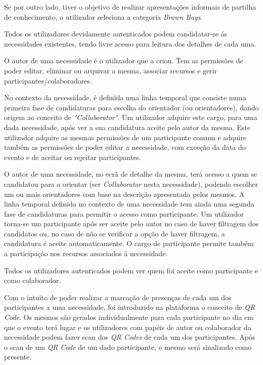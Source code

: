 Se por outro lado, tiver  o objetivo de realizar apresentações informais de partilha de conhecimento, o utilizador seleciona a categoria \textit{Brown Bags}. 
\par
Todos os utilizadores devidamente autenticados podem candidatar-se ás necessidades existentes, tendo livre acesso para leitura dos detalhes de cada uma. 
\par
O autor de uma necessidade é o utilizador que a criou. Tem as permissões de poder editar, eliminar ou arquivar a mesma, associar recursos e gerir participantes/colaboradores.
\par
No contexto da necessidade, é definida uma linha temporal que consiste numa primeira fase de candidaturas para escolha do orientador 
(ou orientadores), dando origem ao conceito de \textit{"Collaborator"}.  
Um utilizador adquire este cargo, para uma dada necessidade, após ver a sua candidatura aceite pelo autor da mesma. Este utilizador adquire as mesmas permissões de um participante comum e adquire também as permissões de poder editar a necessidade, com exceção da data do evento e de aceitar ou rejeitar participantes. 
\par
O autor de uma necessidade, no ecrã de detalhe da mesma, terá acesso a quem se candidatou para a orientar (ser \textit{Collaborator} nesta necessidade), podendo escolher um ou mais orientadores 
com base na descrição apresentada pelos mesmos. 
A linha temporal definida no contexto de uma necessidade tem ainda uma segunda fase de candidaturas para permitir o acesso como participante. 
Um utilizador torna-se um participante após ser aceite pelo autor no caso de haver filtragem dos candidatos ou, no caso de não se verificar a opção de haver filtragem, a candidatura é aceite automaticamente. 
O cargo de participante permite também a participação nos recursos associados à necessidade.
\par
Todos os utilizadores autenticados podem ver quem foi aceite como participante e como colaborador.
\par
Com o intuito de poder realizar a marcação de presenças de cada um dos participantes a uma necessidade, foi introduzido na plataforma o conceito de \textit{QR Code}. 
Os mesmos são gerados individualmente para cada participante no dia em que o evento terá lugar e os utilizadores com papéis de autor ou colaborador da necessidade podem fazer scan dos \textit{QR Codes} de cada um dos participantes.
Após o scan de um \textit{QR Code} de um dado participante, o mesmo será sinalizado como presente.

